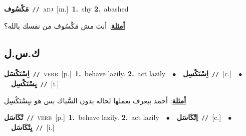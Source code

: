 \documentclass[10pt,a4paper,twoside]{article} %
\begin{document}
\begin{multicols}{2}
{\setlength\topsep{0pt}\textbf{\foreignlanguage{arabic}{مَكْسُوف}}\ {\color{gray}\texttt{//}\color{black}}\ \textsc{adj}\ [m.]\ \textbf{1.}~shy  \textbf{2.}~abashed\  \begin{flushright}\color{gray}\foreignlanguage{arabic}{\textbf{\underline{\foreignlanguage{arabic}{أمثلة}}}: أنت مش مَكْسُوف من نفسك بالله؟}\end{flushright}\color{black}} \vspace{2mm}

\vspace{-3mm}
\subsection*{\color{blue}\foreignlanguage{arabic}{ك.س.ل}\color{blue}{}} 

{\setlength\topsep{0pt}\textbf{\foreignlanguage{arabic}{اِسْتَكْسَل}}\ {\color{gray}\texttt{//}\color{black}}\ \textsc{verb}\ [p.]\ \textbf{1.}~behave lazily.  \textbf{2.}~act lazily\ \ $\bullet$\ \ \setlength\topsep{0pt}\textbf{\foreignlanguage{arabic}{اِسْتَكْسِل}}\ {\color{gray}\texttt{//}\color{black}}\ [c.]\ \ $\bullet$\ \ \setlength\topsep{0pt}\textbf{\foreignlanguage{arabic}{يِسْتَكْسِل}}\ {\color{gray}\texttt{//}\color{black}}\ [i.]\  \begin{flushright}\color{gray}\foreignlanguage{arabic}{\textbf{\underline{\foreignlanguage{arabic}{أمثلة}}}: أحمد بيعرف يعملها لحاله بدون السَّباك بس هو بيِسْتَكْسِل}\end{flushright}\color{black}} \vspace{2mm}

{\setlength\topsep{0pt}\textbf{\foreignlanguage{arabic}{تْكَاسَل}}\ {\color{gray}\texttt{//}\color{black}}\ \textsc{verb}\ [p.]\ \textbf{1.}~behave lazily.  \textbf{2.}~act lazily\ \ $\bullet$\ \ \setlength\topsep{0pt}\textbf{\foreignlanguage{arabic}{اِتْكَاسَل}}\ {\color{gray}\texttt{//}\color{black}}\ [c.]\ \ $\bullet$\ \ \setlength\topsep{0pt}\textbf{\foreignlanguage{arabic}{يِتْكَاسَل}}\ {\color{gray}\texttt{//}\color{black}}\ [i.]\ } \vspace{2mm}


\end{multicols}
\end{document}
